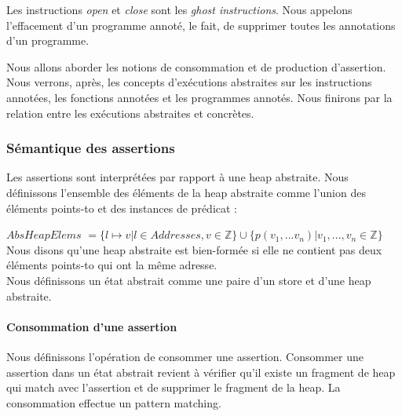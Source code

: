 \documentclass[11pt,openany]{article}
\begin{document}
	Les instructions \textit{open} et \textit{close} sont les \textit{ghost instructions}. Nous appelons l'effacement d'un programme annot\'e, le fait, de supprimer toutes les annotations d'un programme.\\ \par
	
	Nous allons aborder les notions de consommation et de production d'assertion. Nous verrons, apr\`es, les concepts d'ex\'ecutions abstraites sur les instructions annot\'ees, les fonctions annot\'ees et les programmes annot\'es. Nous finirons par la relation entre les ex\'ecutions abstraites et concr\`etes.\\
		\subsubsection{S\'emantique des assertions}
	Les assertions sont interpr\'et\'ees par rapport \`a une heap abstraite. Nous d\'efinissons l'ensemble des \'el\'ements de la heap abstraite comme l'union des \'el\'ements points-to et des instances de pr\'edicat :\par
	$AbsHeapElems$ $= \{l\mapsto v| l\in Addresses, v\in \mathbb{Z}\}\cup\{p(v_1,...v_n)|v_1,...,v_n\in\mathbb{Z}\}$\\
	Nous disons qu'une heap abstraite est bien-form\'ee si elle ne contient pas deux \'el\'ements points-to qui ont la m\^eme adresse.\\
	Nous d\'efinissons un \'etat abstrait comme une paire d'un store et d'une heap abstraite.
	
			\paragraph{Consommation d'une assertion}
			Nous d\'efinissons l'op\'eration de consommer une assertion. Consommer une assertion dans un \'etat abstrait revient \`a v\'erifier qu'il existe un fragment de heap qui match avec l'assertion et de supprimer le fragment de la heap. La consommation effectue un pattern matching.\par
	
\end{document}
